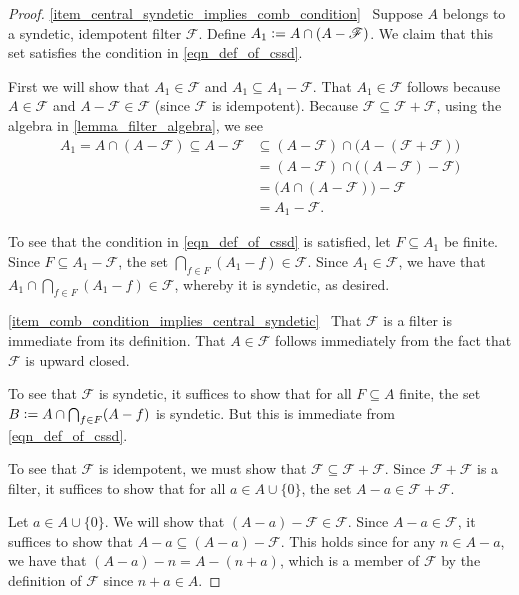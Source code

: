 \documentclass[letter,11pt]{article}
\theoremstyle{plain}
\theoremstyle{definition}
\theoremstyle{plain}
\theoremstyle{plain}
\numberwithin{equation}{section}
\newcommand{\defeq}{\vcentcolon=}
\newcommand{\filter}{\mathscr{F}}
\begin{document}
\begin{proof}
    \eqref{item_central_syndetic_implies_comb_condition} \ Suppose $A$ belongs to a syndetic, idempotent filter $\filter$.  Define $A_1 \defeq A \cap (A-\filter)$.  We claim that this set satisfies the condition in \eqref{eqn_def_of_cssd}.

    First we will show that $A_1 \in \filter$ and $A_1 \subseteq A_1 - \filter$.  That $A_1 \in \filter$ follows because $A \in \filter$ and $A-\filter \in \filter$ (since $\filter$ is idempotent).  Because $\filter \subseteq \filter + \filter$, using the algebra in \cref{lemma_filter_algebra}, we see
    \begin{align*}
        A_1 = A \cap (A-\filter) \subseteq A - \filter &\subseteq (A - \filter) \cap \big(A - (\filter + \filter) \big) \\
        &= (A - \filter) \cap \big((A - \filter) - \filter \big) \\
        &= \big( A \cap (A - \filter) \big) - \filter \\
        &= A_1 - \filter.
    \end{align*}

    To see that the condition in \eqref{eqn_def_of_cssd} is satisfied, let $F \subseteq A_1$ be finite.  Since $F \subseteq A_1 - \filter$, the set $\bigcap_{f \in F} (A_1 - f) \in \filter$.  Since $A_1 \in \filter$, we have that $A_1 \cap \bigcap_{f \in F} (A_1 - f) \in \filter$, whereby it is syndetic, as desired.

    \eqref{item_comb_condition_implies_central_syndetic} \ That $\filter$ is a filter is immediate from its definition.  That $A \in \filter$ follows immediately from the fact that $\filter$ is upward closed.

    To see that $\filter$ is syndetic, it suffices to show that for all $F \subseteq A$ finite, the set $B \defeq A \cap \bigcap_{f \in F} (A - f)$ is syndetic.  But this is immediate from \eqref{eqn_def_of_cssd}.

    To see that $\filter$ is idempotent, we must show that $\filter \subseteq \filter + \filter$.  Since $\filter + \filter$ is a filter, it suffices to show that for all $a \in A \cup\{0\}$, the set $A - a \in \filter + \filter$.
    
    Let $a \in A \cup\{0\}$.  We will show that $(A - a) - \filter \in \filter$.  Since $A - a \in \filter$, it suffices to show that $A - a \subseteq (A - a) - \filter$.  This holds since for any $n \in A - a$, we have that $(A - a) - n = A - (n + a)$, which is a member of $\filter$ by the definition of $\filter$ since $n+a \in A$.
\end{proof}
\end{document}
